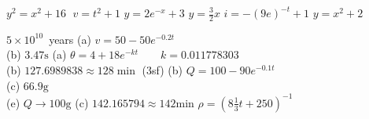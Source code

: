 \begin{Answer}[ref={exSepEqns}]
\Question %
\begin{tasks}
	\task $y^{2} =x^{2} +16$
	\task $\;v =t^{2} +1$ 
	\task $y =2 e^{ -x} +3$
	\task $y =\frac{3}{2} x$
	\task $i =-(9e)^{ -t} +1$
	\task $y =x^2+2$ 
\end{tasks}

\Question %
$5 \times 10^{10}\,$ years 
\Question%
(a)  $v =50 -50 e^{ -0.2 t}$\\
(b)  $3.47 \mbox{s}$
\Question %
(a)  $\theta  =4 +18 e^{ -k t}\qquad k =0.011778303$ \\
(b)  $127.6989838 \approx 128\min $ (3sf) 
\Question %
(b)  $Q =100 -90 e^{ -0.1 t}$\\
(c)  $66.9 \mbox{g}$\\
(e)  $Q \rightarrow 100 \mbox{g}$ 
\Question %
(c)  $142.165794 \approx 142 \mbox{min}$ 
\Question %
$\rho  =\left (8\frac{1}{3} t +250\right )^{ -1}$ 
\end{Answer}%


